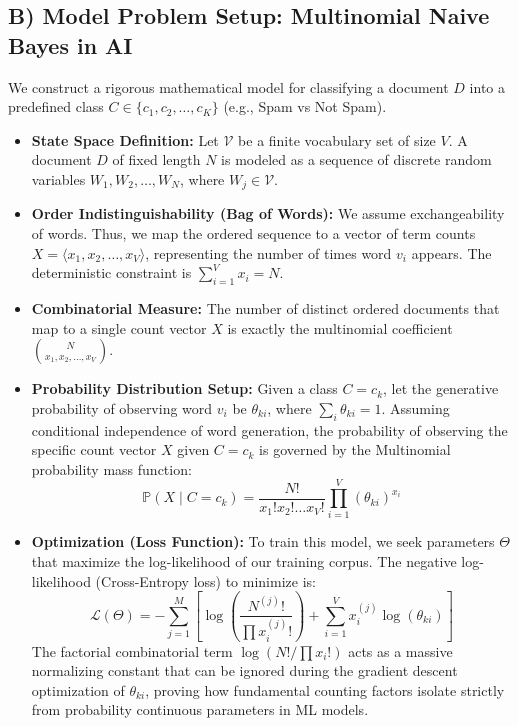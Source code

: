 \documentclass[11pt]{article}
\theoremstyle{definition}
\theoremstyle{plain}
\theoremstyle{remark}
\newcommand{\Prob}{\mathbb{P}}
\begin{document}
\subsection{B) Model Problem Setup: Multinomial Naive Bayes in AI}
We construct a rigorous mathematical model for classifying a document $D$ into a predefined class $C \in \{c_1, c_2, \dots, c_K\}$ (e.g., Spam vs Not Spam).
\begin{itemize}
    \item \textbf{State Space Definition:} Let $\mathcal{V}$ be a finite vocabulary set of size $V$. A document $D$ of fixed length $N$ is modeled as a sequence of discrete random variables $W_1, W_2, \dots, W_N$, where $W_j \in \mathcal{V}$.
    \item \textbf{Order Indistinguishability (Bag of Words):} We assume exchangeability of words. Thus, we map the ordered sequence to a vector of term counts $X = \langle x_1, x_2, \dots, x_V \rangle$, representing the number of times word $v_i$ appears. The deterministic constraint is $\sum_{i=1}^V x_i = N$.
    \item \textbf{Combinatorial Measure:} The number of distinct ordered documents that map to a single count vector $X$ is exactly the multinomial coefficient $\binom{N}{x_1, x_2, \dots, x_V}$.
    \item \textbf{Probability Distribution Setup:} Given a class $C = c_k$, let the generative probability of observing word $v_i$ be $\theta_{ki}$, where $\sum_{i} \theta_{ki} = 1$. Assuming conditional independence of word generation, the probability of observing the specific count vector $X$ given $C=c_k$ is governed by the Multinomial probability mass function:
    \[
    \Prob(X \mid C=c_k) = \frac{N!}{x_1! x_2! \dots x_V!} \prod_{i=1}^V (\theta_{ki})^{x_i}
    \]
    \item \textbf{Optimization (Loss Function):} To train this model, we seek parameters $\Theta$ that maximize the log-likelihood of our training corpus. The negative log-likelihood (Cross-Entropy loss) to minimize is:
    \[
    \mathcal{L}(\Theta) = - \sum_{j=1}^M \left[ \log \left( \frac{N^{(j)}!}{\prod x_i^{(j)}!} \right) + \sum_{i=1}^V x_i^{(j)} \log(\theta_{ki}) \right]
    \]
    The factorial combinatorial term $\log(N!/\prod x_i!)$ acts as a massive normalizing constant that can be ignored during the gradient descent optimization of $\theta_{ki}$, proving how fundamental counting factors isolate strictly from probability continuous parameters in ML models.
\end{itemize}
\end{document}
